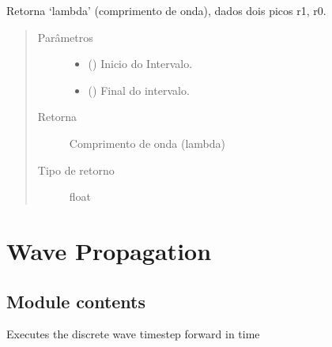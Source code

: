 \documentclass[letterpaper,10pt,brazil]{sphinxmanual}
\begin{document}
\begin{fulllineitems}
\label{\detokenize{source/base:base.wavelength}}
Retorna ‘lambda’ (comprimento de onda), dados dois picos r1, r0.
\begin{quote}\begin{description}
\item[{Parâmetros}] \leavevmode\begin{itemize}
\item {} 
 () \textendash{} Inicio do Intervalo.

\item {} 
 () \textendash{} Final do intervalo.

\end{itemize}

\item[{Retorna}] \leavevmode
Comprimento de onda (lambda)

\item[{Tipo de retorno}] \leavevmode
float

\end{description}\end{quote}

\end{fulllineitems}



\section{Wave Propagation}
\label{\detokenize{source/wave::doc}}\label{\detokenize{source/wave:wave-propagation}}

\subsection{Module contents}
\label{\detokenize{source/wave:module-wave}}\label{\detokenize{source/wave:module-contents}}

\begin{fulllineitems}
\label{\detokenize{source/wave:wave.discrete_wave_step_3d}}
Executes the discrete wave timestep forward in time

\end{fulllineitems}
\end{document}
